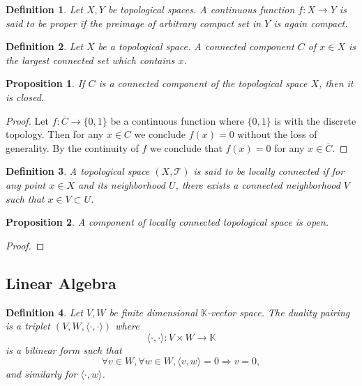 \documentclass{article}
\newtheorem{proposition}{Proposition}[section]
\newtheorem{definition}{Definition}[section]
\numberwithin{equation}{section}
\begin{document}
\begin{definition}
Let $X,Y$ be topological spaces. A continuous function $f:X\to Y$ is said to be proper if the preimage of arbitrary compact set in $Y$ is again compact.
\end{definition}

\begin{definition}
Let $X$ be a topological space. A connected component $C$ of $x\in X$ is the largest connected set which contains $x$.
\end{definition}

\begin{proposition}
If $C$ is a connected component of the topological space $X$, then it is closed.
\label{comp_clo}
\end{proposition}

\begin{proof}
Let $f:\overline{C}\to\{0,1\}$ be a continuous function where $\{0,1\}$ is  with the discrete topology. Then for any $x\in C$ we conclude $f(x)=0$ without the loss of generality. By the continuity of $f$ we conclude that $f(x)=0$ for any $x\in \overline{C}$. 
\end{proof}

\begin{definition}
A topological space $(X,\mathcal{T})$ is said to be locally connected if for any point $x\in X$ and its neighborhood $U$, there exists a connected neighborhood $V$ such that $x\in V\subset U$.
\end{definition}

\begin{proposition}
A component of locally connected topological space is open.
\label{comp_op_loc}
\end{proposition}

\begin{proof}
\end{proof}

\subsection{Linear Algebra}

\begin{definition}
Let $V,W$ be finite dimensional $\mathbb{K}$-vector space. The duality pairing is a triplet $(V,W,\langle\cdot,\cdot\rangle)$ where 
\begin{equation*}
\langle\cdot,\cdot\rangle:V\times W\to\mathbb{K}
\end{equation*}
is a bilinear form such that
\begin{equation*}
\forall v\in W, \forall w\in W, \langle v,w\rangle = 0\Rightarrow v = 0,
\end{equation*}
and similarly for $\langle\cdot,w\rangle$.
\end{definition}
\end{document}
